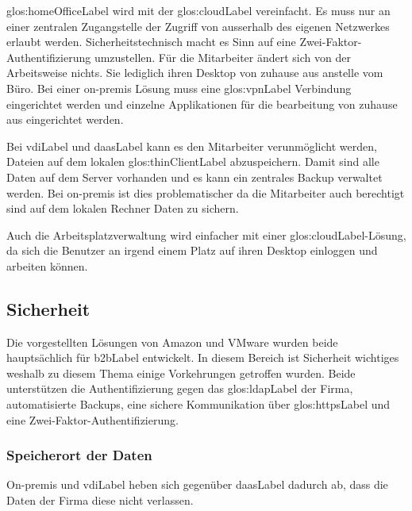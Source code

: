 \gls{glos:homeOfficeLabel} wird mit der \Gls{glos:cloudLabel} vereinfacht. Es muss nur an einer zentralen Zugangstelle der Zugriff von ausserhalb des eigenen Netzwerkes erlaubt werden. Sicherheitstechnisch macht es Sinn auf eine Zwei-Faktor-Authentifizierung umzustellen. Für die Mitarbeiter ändert sich von der Arbeitsweise nichts. Sie lediglich ihren Desktop von zuhause aus anstelle vom Büro. Bei einer on-premis Lösung muss eine \gls{glos:vpnLabel} Verbindung eingerichtet werden und einzelne Applikationen für die bearbeitung von zuhause aus eingerichtet werden.

Bei \Gls{vdiLabel} und \Gls{daasLabel} kann es den Mitarbeiter verunmöglicht werden, Dateien auf dem lokalen \gls{glos:thinClientLabel} abzuspeichern. Damit sind alle Daten auf dem Server vorhanden und es kann ein zentrales Backup verwaltet werden. Bei on-premis ist dies problematischer da die Mitarbeiter auch berechtigt sind auf dem lokalen Rechner Daten zu sichern.

Auch die Arbeitsplatzverwaltung wird einfacher mit einer \Gls{glos:cloudLabel}-Lösung, da sich die Benutzer an irgend einem Platz auf ihren Desktop einloggen und arbeiten können.

\subsection{Sicherheit}
Die vorgestellten Lösungen von Amazon und VMware wurden beide hauptsächlich für \Gls{b2bLabel} entwickelt. In diesem Bereich ist Sicherheit wichtiges weshalb zu diesem Thema einige Vorkehrungen getroffen wurden. Beide unterstützen die Authentifizierung gegen das \gls{glos:ldapLabel} der Firma, automatisierte Backups, eine sichere Kommunikation über \gls{glos:httpsLabel} und eine Zwei-Faktor-Authentifizierung.

\subsubsection{Speicherort der Daten}
On-premis und \Gls{vdiLabel} heben sich gegenüber \Gls{daasLabel} dadurch ab, dass die Daten der Firma diese nicht verlassen.

